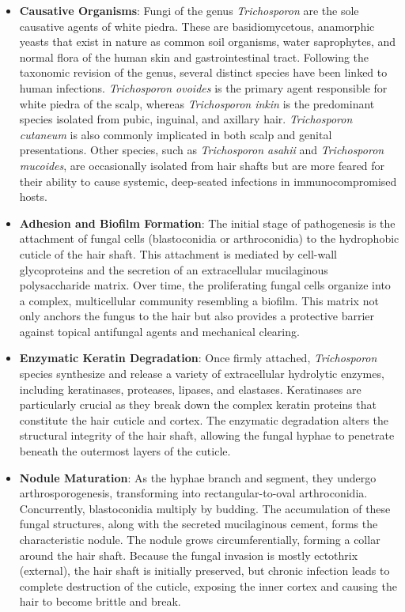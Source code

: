 \begin{itemize}
    \item \textbf{Causative Organisms}: Fungi of the genus \textit{Trichosporon} are the sole causative agents of white piedra. These are basidiomycetous, anamorphic yeasts that exist in nature as common soil organisms, water saprophytes, and normal flora of the human skin and gastrointestinal tract. Following the taxonomic revision of the genus, several distinct species have been linked to human infections. \textit{Trichosporon ovoides} is the primary agent responsible for white piedra of the scalp, whereas \textit{Trichosporon inkin} is the predominant species isolated from pubic, inguinal, and axillary hair. \textit{Trichosporon cutaneum} is also commonly implicated in both scalp and genital presentations. Other species, such as \textit{Trichosporon asahii} and \textit{Trichosporon mucoides}, are occasionally isolated from hair shafts but are more feared for their ability to cause systemic, deep-seated infections in immunocompromised hosts.
    \item \textbf{Adhesion and Biofilm Formation}: The initial stage of pathogenesis is the attachment of fungal cells (blastoconidia or arthroconidia) to the hydrophobic cuticle of the hair shaft. This attachment is mediated by cell-wall glycoproteins and the secretion of an extracellular mucilaginous polysaccharide matrix. Over time, the proliferating fungal cells organize into a complex, multicellular community resembling a biofilm. This matrix not only anchors the fungus to the hair but also provides a protective barrier against topical antifungal agents and mechanical clearing.
    \item \textbf{Enzymatic Keratin Degradation}: Once firmly attached, \textit{Trichosporon} species synthesize and release a variety of extracellular hydrolytic enzymes, including keratinases, proteases, lipases, and elastases. Keratinases are particularly crucial as they break down the complex keratin proteins that constitute the hair cuticle and cortex. The enzymatic degradation alters the structural integrity of the hair shaft, allowing the fungal hyphae to penetrate beneath the outermost layers of the cuticle.
    \item \textbf{Nodule Maturation}: As the hyphae branch and segment, they undergo arthrosporogenesis, transforming into rectangular-to-oval arthroconidia. Concurrently, blastoconidia multiply by budding. The accumulation of these fungal structures, along with the secreted mucilaginous cement, forms the characteristic nodule. The nodule grows circumferentially, forming a collar around the hair shaft. Because the fungal invasion is mostly ectothrix (external), the hair shaft is initially preserved, but chronic infection leads to complete destruction of the cuticle, exposing the inner cortex and causing the hair to become brittle and break.

\end{itemize}
